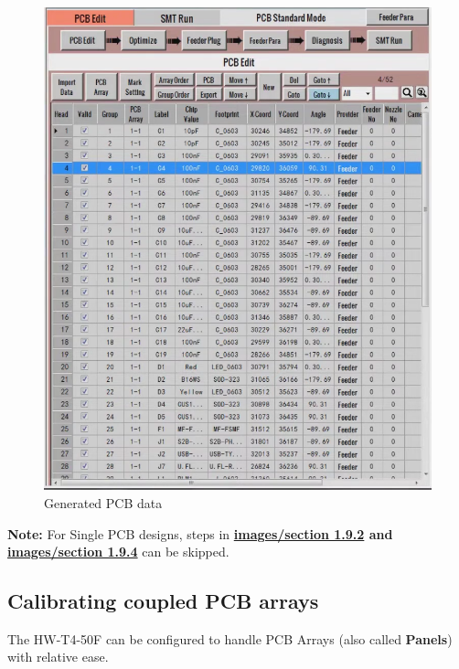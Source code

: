 \documentclass[a4paper,10pt]{report}
\begin{document}
\begin{figure}[!htb]
 \centering
 \includegraphics[width=1\textwidth]{images/scrot7_1.png}
 \caption{Generated PCB data}
\end{figure}
\textbf{Note:} For Single PCB designs, steps in \textbf{\textbf{\hyperref[sec:1.9.2]{images/section 1.9.2}} and \textbf{\hyperref[sec:1.9.4]{images/section 1.9.4}}} can be skipped.
\newpage
\subsection{Calibrating coupled PCB arrays}
\label{sec:1.9.2}
The HW-T4-50F can be configured to handle PCB Arrays (also called \textbf{Panels}) with relative ease.\\
\end{document}
